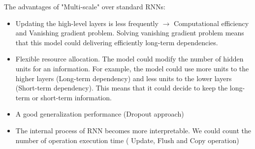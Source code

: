 \documentclass{article}
\begin{document}
The advantages of "Multi-scale" over standard RNNs:
\begin{itemize}
\item Updating the high-level layers is less frequently $\rightarrow$ Computational efficiency and Vanishing gradient problem. Solving vanishing gradient problem means that this model could delivering efficiently long-term dependencies.
\item Flexible resource allocation. The model could modify the number of hidden units for an information. For example, the model could use more units to the higher layers (Long-term dependency) and less units to the lower layers (Short-term dependency). This means that it could decide to keep the long-term or short-term information.

\item A good generalization performance (Dropout approach)
\item The internal process of RNN becomes more interpretable. We could count the number of operation execution time ( Update, Flush and Copy operation)
\end{itemize}
\end{document}
